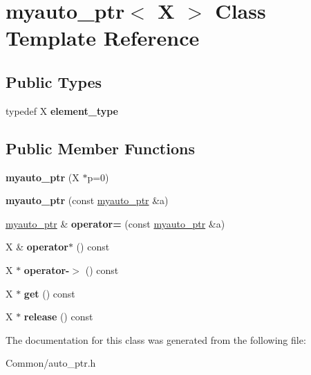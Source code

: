 \hypertarget{classmyauto__ptr}{\section{myauto\-\_\-ptr$<$ X $>$ Class Template Reference}
\label{classmyauto__ptr}
}
\subsection*{Public Types}
\begin{DoxyCompactItemize}
\item 
\hypertarget{classmyauto__ptr_a5bd4197c8d3825450a05fee341b194c2}{typedef X {\bfseries element\-\_\-type}}\label{classmyauto__ptr_a5bd4197c8d3825450a05fee341b194c2}

\end{DoxyCompactItemize}
\subsection*{Public Member Functions}
\begin{DoxyCompactItemize}
\item 
\hypertarget{classmyauto__ptr_ac80c5eed05ad474f4719aec620cc2276}{{\bfseries myauto\-\_\-ptr} (X $\ast$p=0)}\label{classmyauto__ptr_ac80c5eed05ad474f4719aec620cc2276}

\item 
\hypertarget{classmyauto__ptr_a5516d4846374475d72f9636b992d3e20}{{\bfseries myauto\-\_\-ptr} (const \hyperlink{classmyauto__ptr}{myauto\-\_\-ptr} \&a)}\label{classmyauto__ptr_a5516d4846374475d72f9636b992d3e20}

\item 
\hypertarget{classmyauto__ptr_acd9f62ccfbcc73e6d35f7d26b2619b5f}{\hyperlink{classmyauto__ptr}{myauto\-\_\-ptr} \& {\bfseries operator=} (const \hyperlink{classmyauto__ptr}{myauto\-\_\-ptr} \&a)}\label{classmyauto__ptr_acd9f62ccfbcc73e6d35f7d26b2619b5f}

\item 
\hypertarget{classmyauto__ptr_a79c8ab801437d45a55eb9546095dc287}{X \& {\bfseries operator$\ast$} () const }\label{classmyauto__ptr_a79c8ab801437d45a55eb9546095dc287}

\item 
\hypertarget{classmyauto__ptr_a6765cc8f5e07d883b05cd05a2fa3e626}{X $\ast$ {\bfseries operator-\/$>$} () const }\label{classmyauto__ptr_a6765cc8f5e07d883b05cd05a2fa3e626}

\item 
\hypertarget{classmyauto__ptr_a8dc00ddeecc31e7c9c0c54420342877c}{X $\ast$ {\bfseries get} () const }\label{classmyauto__ptr_a8dc00ddeecc31e7c9c0c54420342877c}

\item 
\hypertarget{classmyauto__ptr_ab0d144c02d4cf2496e6821fdd60d56bd}{X $\ast$ {\bfseries release} () const }\label{classmyauto__ptr_ab0d144c02d4cf2496e6821fdd60d56bd}

\end{DoxyCompactItemize}


The documentation for this class was generated from the following file\-:\begin{DoxyCompactItemize}
\item 
Common/auto\-\_\-ptr.\-h\end{DoxyCompactItemize}
